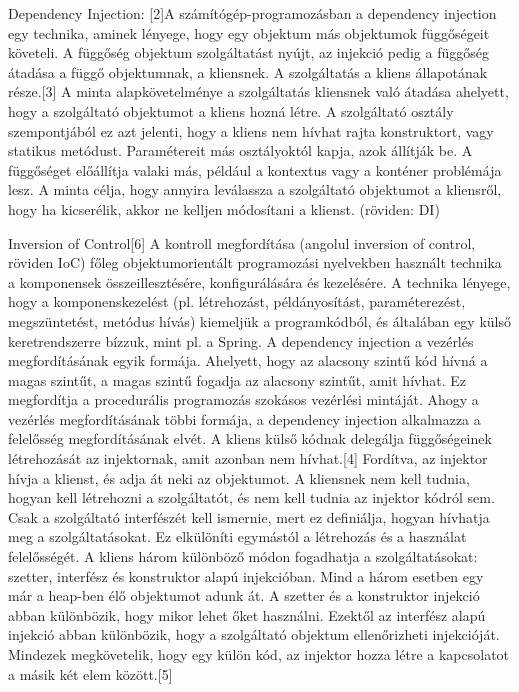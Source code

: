 Dependency Injection: [2]A számítógép-programozásban a dependency injection egy technika, aminek lényege, hogy egy objektum más objektumok függőségeit követeli. A függőség objektum szolgáltatást nyújt, az injekció pedig a függőség átadása a függő objektumnak, a kliensnek. A szolgáltatás a kliens állapotának része.[3] A minta alapkövetelménye a szolgáltatás kliensnek való átadása ahelyett, hogy a szolgáltató objektumot a kliens hozná létre. A szolgáltató osztály szempontjából ez azt jelenti, hogy a kliens nem hívhat rajta konstruktort, vagy statikus metódust. Paramétereit más osztályoktól kapja, azok állítják be. A függőséget előállítja valaki más, például a kontextus vagy a konténer problémája lesz. A minta célja, hogy annyira leválassza a szolgáltató objektumot a kliensről, hogy ha kicserélik, akkor ne kelljen módosítani a klienst. (röviden: DI)

Inversion of Control[6] A kontroll megfordítása (angolul inversion of control, röviden IoC) főleg objektumorientált programozási nyelvekben használt technika a komponensek összeillesztésére, konfigurálására és kezelésére.
A technika lényege, hogy a komponenskezelést (pl. létrehozást, példányosítást, paraméterezést, megszüntetést, metódus hívás) kiemeljük a programkódból, és általában egy külső keretrendszerre bízzuk, mint pl. a Spring.
A dependency injection a vezérlés megfordításának egyik formája. Ahelyett, hogy az alacsony szintű kód hívná a magas szintűt, a magas szintű fogadja az alacsony szintűt, amit hívhat. Ez megfordítja a procedurális programozás szokásos vezérlési mintáját.
Ahogy a vezérlés megfordításának többi formája, a dependency injection alkalmazza a felelősség megfordításának elvét. A kliens külső kódnak delegálja függőségeinek létrehozását az injektornak, amit azonban nem hívhat.[4] Fordítva, az injektor hívja a klienst, és adja át neki az objektumot. A kliensnek nem kell tudnia, hogyan kell létrehozni a szolgáltatót, és nem kell tudnia az injektor kódról sem. Csak a szolgáltató interfészét kell ismernie, mert ez definiálja, hogyan hívhatja meg a szolgáltatásokat. Ez elkülöníti egymástól a létrehozás és a használat felelősségét.
A kliens három különböző módon fogadhatja a szolgáltatásokat: szetter, interfész és konstruktor alapú injekcióban. Mind a három esetben egy már a heap-ben élő objektumot adunk át. A szetter és a konstruktor injekció abban különbözik, hogy mikor lehet őket használni. Ezektől az interfész alapú injekció abban különbözik, hogy a szolgáltató objektum ellenőrizheti injekcióját. Mindezek megkövetelik, hogy egy külön kód, az injektor hozza létre a kapcsolatot a másik két elem között.[5]

